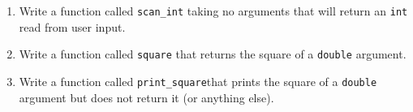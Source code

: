 \documentclass{article}
\begin{document}
\begin{enumerate}
\begin{enumerate}
\item 
\begin{lstlisting}[style=CStyle]
#include <stdio.h>

void goodbye() {
    printf("See ya!\n");
}
\end{lstlisting}

\item
\begin{lstlisting}[style=CStyle]
int main(void) {
    int func(int a) {
        return a * 2;
    }
    int a = func(2);
    return 0;
}
\end{lstlisting}
\end{enumerate}
\item Write a function called \verb|scan_int| taking no arguments that will return an \verb|int| read from user input.
\item Write a function called \verb|square| that returns the square of a \verb|double| argument.
\item Write a function called \verb|print_square|that prints the square of a \verb|double| argument but does not return 
it (or anything else). 

\end{enumerate}
\end{document}
